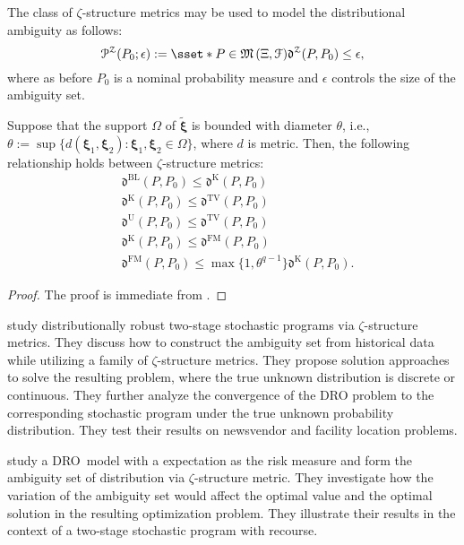 \documentclass[final,onefignum,onetabnum]{class}
\newcommand{\bs}[1]{\boldsymbol{#1}} %
\newcommand{\Cs}[1]{\mathcal{#1}} %
\newcommand{\Fs}[1]{\mathfrak{#1}} %
\newcommand{\txi}{\tilde{\bs{\xi}}}
\newcommand{\measurespace}{\left( \Xi, \Cs{F} \right)}
\newcommand{\dro}{DRO}
\begin{document}
 
The class of $\zeta$-structure metrics  may be used to model the distributional ambiguity as follows:
\begin{equation}
\label{eq: rev.zeta_set}
\Cs{P}^{\Cs{Z}}(P_{0};\epsilon):= \sset*{P \in \Fs{M}\measurespace}{ \Fs{d}^{\Cs{Z}}(P,P_{0}) \le \epsilon},
\end{equation}
where as before $P_{0}$ is a nominal probability measure and $\epsilon$ controls the size of the ambiguity set. 

\begin{lemma}
    \label{lem: rev.zeta}
    Suppose that the support $\Omega$ of $\txi$ is bounded with diameter $\theta$, i.e.,   $\theta:=\sup\{d(\bs{\xi}_{1}, \bs{\xi}_{2}): \bs{\xi}_{1}, \bs{\xi}_{2} \in \Omega\}$, where $d$ is metric. Then, the following relationship holds between $\zeta$-structure metrics:
    \begin{subequations}
        \label{eq: rev.zeta}
        \begin{align*}
            & \Fs{d}^{\text{BL}}(P,P_0) \le \Fs{d}^{\text{K}}(P,P_0)\\
            & \Fs{d}^{\text{K}}(P,P_0) \le \Fs{d}^{\text{TV}}(P,P_0)\\
            & \Fs{d}^{\text{U}}(P,P_0) \le \Fs{d}^{\text{TV}}(P,P_0)\\
            & \Fs{d}^{\text{K}}(P,P_0) \le \Fs{d}^{\text{FM}}(P,P_0)\\
            & \Fs{d}^{\text{FM}}(P,P_0) \le \max\{1, \theta^{q-1}\}\Fs{d}^{\text{K}}(P,P_0).
        \end{align*}
    \end{subequations}
\end{lemma}

\begin{proof}
The proof is immediate from \citet[Lemmas~1--4]{zhao2015}.
\end{proof}
\citet{zhao2015} study distributionally robust two-stage stochastic programs via $\zeta$-structure  metrics. They discuss how to construct the ambiguity set from historical data while utilizing a family of $\zeta$-structure  metrics. They propose solution approaches to solve the resulting problem, where the true unknown distribution is discrete or continuous. They further analyze the convergence of the DRO problem to  the corresponding stochastic program under the true unknown probability distribution. They test their results on newsvendor and facility location problems.  

\citet{pichler2017} study a \dro\ model with a expectation as the risk measure and form the ambiguity set of distribution via $\zeta$-structure metric. They investigate how the variation of the ambiguity set would affect the optimal value and the optimal solution in the resulting optimization problem. They illustrate their results in the context of a two-stage stochastic program with recourse. 
\end{document}
